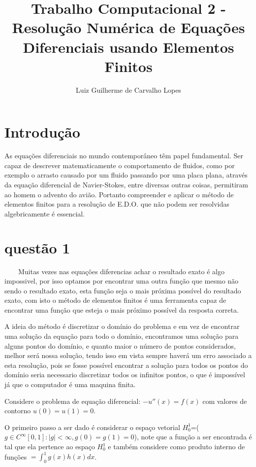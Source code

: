 \documentclass[a4paper]{article}
\title{Trabalho Computacional 2 - Resolução Numérica de Equações Diferenciais
usando Elementos Finitos}
\author{Luiz Guilherme de Carvalho Lopes}
\begin{document}
\maketitle

\maketitle

\section{Introdução}



As equações diferenciais no mundo contemporâneo têm papel fundamental. Ser capaz de descrever matematicamente o comportamento de fluidos, como por exemplo o arrasto causado por um fluido passando por uma placa plana, através da equação diferencial de Navier-Stokes, entre diversas outras coisas, permitiram ao homem o advento do avião. Portanto compreender e aplicar o método de elementos finitos para a resolução de E.D.O. que não podem ser resolvidas algebricamente é essencial.

\section{questão 1}

\ \ \ \  Muitas vezes nas equações diferencias achar o resultado exato é algo impossivel, por isso optamos por encontrar uma outra função que mesmo não sendo o resultado exato, esta função seja o mais próxima possível do resultado exato, com isto o método de elementos finitos é uma ferramenta capaz de encontrar uma função que esteja o mais próximo possível da resposta correta.

A ideia do método é discretizar o domínio do problema e em vez de encontrar uma solução da equação para todo o domínio, encontramos uma solução para alguns pontos do domínio, e quanto maior o número de pontos considerados, melhor será nossa solução, tendo isso em vista sempre haverá um erro associado a esta resolução, pois se fosse possível encontrar a solução para todos os pontos do domínio seria necessario discretizar todos os infinitos pontos, o que é impossível já que o computador é uma maquina finita.

Considere o problema de equação diferencial:
\(-u''(x)=f(x)\) com valores de contorno  \(u(0)=u(1)=0 \).


O primeiro passo a ser dado é considerar o espaço vetorial \(H_{0}^{1}\)=(\(g\in C^{\infty} [0,1] :|g|<{\infty}, g(0)=g(1)=0 \)), note que a função a ser encontrada é tal que ela pertence ao espaço \(H_{0}^{1}\) e também considere como produto interno de funções \(<g,h>= \int_{0}^{1}g(x)h(x)dx \).
\end{document}
